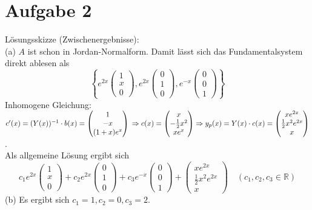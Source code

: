 \documentclass{scrartcl}
\begin{document}
\section*{Aufgabe 2}
Lösungsskizze (Zwischenergebnisse):\\
(a) $A$ ist schon in Jordan-Normalform. Damit lässt sich das Fundamentalsystem direkt ablesen als
$$\left\lbrace e^{2x}\begin{pmatrix}1\\x\\0\end{pmatrix}, e^{2x}\begin{pmatrix}0\\1\\0\end{pmatrix},
e^{-x}\begin{pmatrix}0\\0\\ 1\end{pmatrix}\right\rbrace$$
Inhomogene Gleichung:\\
$c^\prime(x)=(Y(x))^{-1}\cdot b(x)  =\begin{pmatrix}1\\-x\\ (1+x)e^x\end{pmatrix}\\
\Rightarrow c(x)= \begin{pmatrix}x\\-\frac{1}{2}x^2\\ xe^x\end{pmatrix}
\Rightarrow y_p(x)=Y(x)\cdot c(x)=\begin{pmatrix}xe^{2x}\\\frac{1}{2}x^2e^{2x}\\ x\end{pmatrix}$.\\
Als allgemeine Lösung ergibt sich $$c_1e^{2x}\begin{pmatrix}1\\x\\0\end{pmatrix}+c_2e^{2x}\begin{pmatrix}0\\1\\0\end{pmatrix} + c_3e^{-x} \begin{pmatrix}0\\0\\ 1\end{pmatrix}+\begin{pmatrix}xe^{2x}\\\frac{1}{2}x^2e^{2x}\\ x\end{pmatrix}\quad (c_1,c_2,c_3\in\mathbb{R})$$\newline
(b) Es ergibt sich $c_1=1, c_2=0, c_3=2$.
\end{document}
